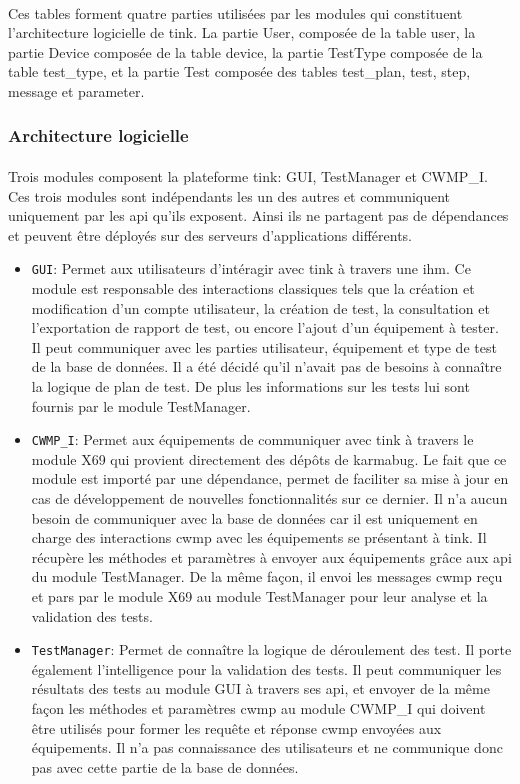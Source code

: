 \documentclass[12pt,a4paper]{report}
\begin{document}
\paragraph*{}Ces tables forment quatre parties utilisées par les modules qui constituent l'architecture logicielle de \gls{tink}. La partie User, composée de la table user, la partie Device composée de la table device, la partie TestType composée de la table test\_type, et la partie Test composée des tables test\_plan, test, step, message et parameter. \\
\newpage
\subsubsection{Architecture logicielle}
\paragraph*{}Trois modules composent la plateforme \gls{tink}: GUI, TestManager et CWMP\_I. Ces trois modules sont indépendants les un des autres et communiquent uniquement par les \gls{api} qu'ils exposent. Ainsi ils ne partagent pas de dépendances et peuvent être déployés sur des serveurs d'applications différents. 
\begin{itemize}
\item \texttt{GUI}: Permet aux utilisateurs d'intéragir avec \gls{tink} à travers une \gls{ihm}. Ce module est responsable des interactions classiques tels que la création et modification d'un compte utilisateur, la création de test, la consultation et l'exportation de rapport de test, ou encore l'ajout d'un équipement à tester. Il peut communiquer avec les parties utilisateur, équipement et type de test de la base de données. Il a été décidé qu'il n'avait pas de besoins à connaître la logique de plan de test. De plus les informations sur les tests lui sont fournis par le module TestManager. 
\item \texttt{CWMP\_I}: Permet aux équipements de communiquer avec \gls{tink} à travers le module X69 qui provient directement des dépôts de \gls{karmabug}. Le fait que ce module est importé par une dépendance, permet de faciliter sa mise à jour en cas de développement de nouvelles fonctionnalités sur ce dernier. Il n'a aucun besoin de communiquer avec la base de données car il est uniquement en charge des interactions \gls{cwmp} avec les équipements se présentant à \gls{tink}. Il récupère les méthodes et paramètres à envoyer aux équipements grâce aux \gls{api} du module TestManager. De la même façon, il envoi les messages \gls{cwmp} reçu et pars par le module X69 au module TestManager pour leur analyse et la validation des tests. 
\item \texttt{TestManager}: Permet de connaître la logique de déroulement des test. Il porte également l'intelligence pour la validation des tests. Il peut communiquer les résultats des tests au module GUI à travers ses \gls{api}, et envoyer de la même façon les méthodes et paramètres \gls{cwmp} au module CWMP\_I qui doivent être utilisés pour former les requête et réponse \gls{cwmp} envoyées aux équipements. Il n'a pas connaissance des utilisateurs et ne communique donc pas avec cette partie de la base de données.
\end{itemize}
\end{document}
